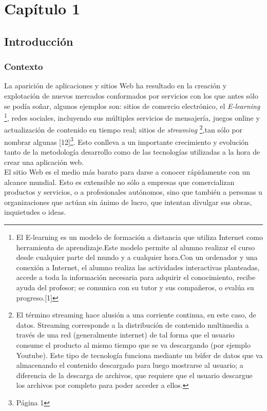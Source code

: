 \chapter{Capítulo 1}
\section{Introducción}

\subsection{Contexto}

La aparición de aplicaciones y sitios Web ha resultado en la creación y explotación de nuevos 
mercados conformados por servicios con los que antes sólo se podía soñar, algunos ejemplos son: sitios de 
comercio electrónico, el \textit{E-learning} \footnote{El E-learning es un modelo de formación a distancia 
que utiliza Internet como herramienta de aprendizaje.Este modelo permite al alumno realizar el curso desde 
cualquier parte del mundo y a cualquier hora.Con un ordenador y una conexión a Internet, el alumno realiza 
las actividades interactivas planteadas, accede a toda la información necesaria para adquirir el conocimiento, 
recibe ayuda del profesor; se comunica con su tutor y sus compañeros, o evalúa su progreso.[1]}, redes sociales, 
incluyendo sus múltiples servicios de mensajería, juegos online y actualización de contenido en tiempo real; 
sitios de \textit{streaming} \footnote{El término streaming hace alusión a una corriente continua, en este caso, de datos.
Streaming corresponde a  la distribución de contenido multimedia a través de una red (generalmente internet)
de tal forma que el usuario consume el producto al mismo tiempo que se va descargando (por ejemplo Youtube). 
Este tipo de tecnología funciona mediante un búfer de datos que va almacenando el contenido descargado para 
luego mostrarse al usuario; a diferencia de la descarga de archivos, que requiere que el usuario descargue los 
archivos por completo para poder acceder a ellos.},tan sólo por nombrar algunas [12]\footnote{Página 1}. Esto 
conlleva a un importante crecimiento y evolución tanto de la metodología desarrollo como de las tecnologías 
utilizadas a la hora de crear una aplicación web.\\


El sitio Web es el medio más barato para darse a conocer rápidamente con un alcance mundial. 
Esto es extensible no sólo a empresas que comercializan productos y servicios, o a profesionales 
autónomos, sino que también a personas u organizaciones que actúan sin ánimo de lucro, que intentan
divulgar sus obras, inquietudes o ideas.\\

